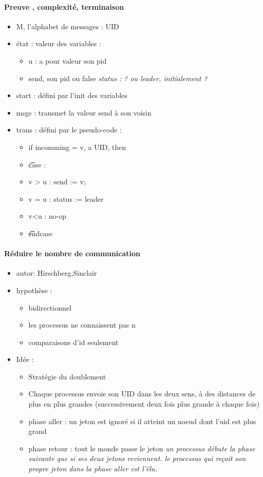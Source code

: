 \documentclass{article}
\begin{document}
\paragraph{Preuve , complexité, terminaison}
\begin{itemize}
\item M, l'alphabet de messages : {UID}
\item état : valeur des variables :
\begin{itemize}
\item u : a pour valeur son pid
\item send, son pid ou false
\it status : ?  ou leader, initialement ?
\end{itemize}
\item start : défini par l'init des variables
\item msgs : transmet la valeur send à son voisin
\item trans : défini par le pseudo-code : 
\begin{itemize}
\item if incomming = v, a UID, then
\item \t case :
\item  v >  u  : send := v;
\item  v = u  : status := leader
\item  v<u : no-op
\item \t endcase
\end{itemize}
\end{itemize}

\paragraph{Réduire le nombre de communication}
\begin{itemize}
\item autor: Hirschberg,Sinclair
\item hypothèse : 
\begin{itemize}
\item bidirectionnel
\item les processus ne connaissent pas n
\item comparaisons d'id seulement
\end{itemize}
\item Idée : 
\begin{itemize}
\item Stratégie du doublement
\item Chaque processus envoie son UID dans les deux sens, à des distances de plus en plus grandes (successivement deux fois plus grande à chaque fois)
\item phase aller : un jeton est ignoré si il atteint un noeud dont l'uid est plus grand
\item phase retour : tout le monde passe le jeton
\it un processus débute la phase suivante que si ses deux jetons reviennent.
\it le processus qui reçoit son propre jeton dans la phase aller est l'élu.
\end{itemize}
\end{itemize}
\end{document}
